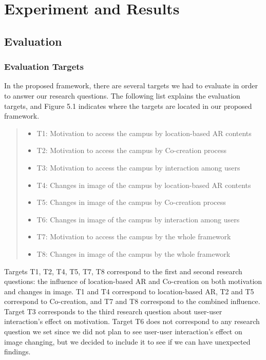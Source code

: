 \chapter{Experiment and Results}\label{ch:5}

\section{Evaluation}

\subsection{Evaluation Targets}

In the proposed framework, there are several targets we had to evaluate in order to answer our research questions.
The following list explains the evaluation targets, and Figure 5.1 indicates where the targets are located in our proposed framework.

\begin{quote}
  \begin{itemize}
    \item T1: Motivation to access the campus by location-based AR contents
    \item T2: Motivation to access the campus by Co-creation process
    \item T3: Motivation to access the campus by interaction among users
    \item T4: Changes in image of the campus by location-based AR contents
    \item T5: Changes in image of the campus by Co-creation process
    \item T6: Changes in image of the campus by interaction among users
    \item T7: Motivation to access the campus by the whole framework
    \item T8: Changes in image of the campus by the whole framework
  \end{itemize}
\end{quote}

Targets T1, T2, T4, T5, T7, T8 correspond to the first and second research questions:
the influence of location-based AR and Co-creation on both motivation and changes in image.
T1 and T4 correspond to location-based AR, T2 and T5 correspond to Co-creation, and T7 and T8 correspond to the combined influence.
Target T3 corresponds to the third research question about user-user interaction's effect on motivation.
Target T6 does not correspond to any research question we set since we did not plan to see user-user interaction's effect on image changing,
but we decided to include it to see if we can have unexpected findings.

